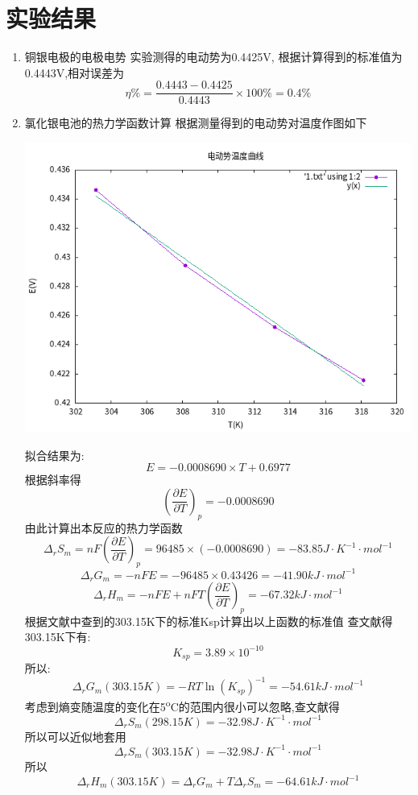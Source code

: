 \documentclass[11pt]{report}
\begin{document}
\section{实验结果}
\label{sec:org996af14}
\begin{enumerate}
\item 铜银电极的电极电势
\label{sec:org11e651c}
实验测得的电动势为0.4425V, 根据计算得到的标准值为0.4443V,相对误差为
\[
     \eta \%= \frac{0.4443-0.4425}{0.4443}\times 100 \%= 0.4\%
     \]
\item 氯化银电池的热力学函数计算
\label{sec:org58c4e7a}
根据测量得到的电动势对温度作图如下
\begin{center}
\includegraphics[width=.9\linewidth]{../data/E-T.png}
\end{center}
拟合结果为:
\[
     E=-0.0008690\times T+0.6977
     \]
根据斜率得
\[
     \left(\frac{\partial E}{\partial T}\right)_{p}=-0.0008690
     \]
由此计算出本反应的热力学函数
\[
     \Delta_{r}S_{m}=nF\left(\frac{\partial E}{\partial T}\right)_{p}=96485\times (-0.0008690)= -83.85J\cdot K^{-1}\cdot mol^{-1}
     \]
\[
     \Delta_{r}G_{m}=-nFE=-96485\times 0.43426 =-41.90kJ\cdot mol^{-1}
     \]
\[
     \Delta_{r}H_{m}=-nFE+nFT\left(\frac{\partial E}{\partial T}\right)_{p}=-67.32kJ\cdot mol^{-1}
     \]
根据文献中查到的303.15K下的标准Ksp计算出以上函数的标准值
查文献得303.15K下有:
\[
     K_{sp}=3.89\times 10^{-10}
     \]
所以:
\[
     \Delta_{r}G_{m}(303.15K)=-RT\ln (K_{sp})^{-1}=-54.61kJ\cdot mol^{-1}
     \]
考虑到熵变随温度的变化在5\textsuperscript{o}C的范围内很小可以忽略,查文献得
\[
     \Delta_{r}S_{m}(298.15K)=-32.98J\cdot K^{-1} \cdot mol^{-1}
     \]
所以可以近似地套用
\[
     \Delta_{r}S_{m}(303.15K)=-32.98J\cdot K^{-1} \cdot mol^{-1}
     \]
所以
\[
     \Delta_{r}H_{m}(303.15K)=\Delta_{r}G_{m}+T\Delta_{r}S_{m}=-64.61kJ\cdot mol^{-1}
\]
\end{enumerate}
\end{document}
